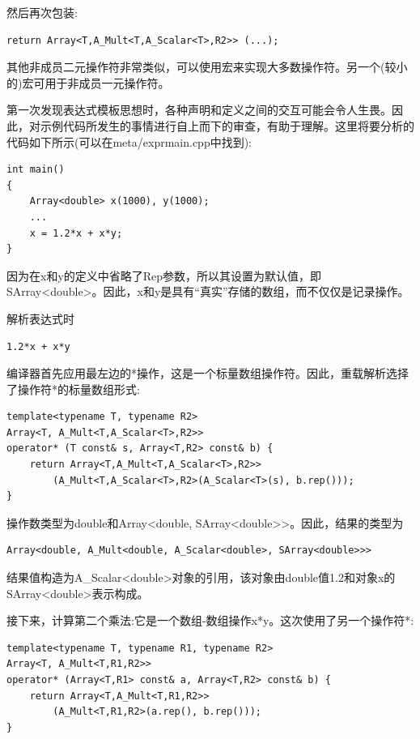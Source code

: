 然后再次包装:

\begin{lstlisting}[style=styleCXX]
return Array<T,A_Mult<T,A_Scalar<T>,R2>> (...);
\end{lstlisting}

其他非成员二元操作符非常类似，可以使用宏来实现大多数操作符。另一个(较小的)宏可用于非成员一元操作符。


第一次发现表达式模板思想时，各种声明和定义之间的交互可能会令人生畏。因此，对示例代码所发生的事情进行自上而下的审查，有助于理解。这里将要分析的代码如下所示(可以在meta/exprmain.cpp中找到):

\begin{lstlisting}[style=styleCXX]
int main()
{
	Array<double> x(1000), y(1000);
	...
	x = 1.2*x + x*y;
}
\end{lstlisting}

因为在x和y的定义中省略了Rep参数，所以其设置为默认值，即SArray<double>。因此，x和y是具有“真实”存储的数组，而不仅仅是记录操作。

解析表达式时

\begin{lstlisting}[style=styleCXX]
1.2*x + x*y
\end{lstlisting}

编译器首先应用最左边的*操作，这是一个标量数组操作符。因此，重载解析选择了操作符*的标量数组形式:

\begin{lstlisting}[style=styleCXX]
template<typename T, typename R2>
Array<T, A_Mult<T,A_Scalar<T>,R2>>
operator* (T const& s, Array<T,R2> const& b) {
	return Array<T,A_Mult<T,A_Scalar<T>,R2>>
		(A_Mult<T,A_Scalar<T>,R2>(A_Scalar<T>(s), b.rep()));
}
\end{lstlisting}

操作数类型为double和Array<double, SArray<double>{}>。因此，结果的类型为

\begin{lstlisting}[style=styleCXX]
Array<double, A_Mult<double, A_Scalar<double>, SArray<double>>>
\end{lstlisting}

结果值构造为A\_Scalar<double>对象的引用，该对象由double值1.2和对象x的SArray<double>表示构成。

接下来，计算第二个乘法:它是一个数组-数组操作x*y。这次使用了另一个操作符*:

\begin{lstlisting}[style=styleCXX]
template<typename T, typename R1, typename R2>
Array<T, A_Mult<T,R1,R2>>
operator* (Array<T,R1> const& a, Array<T,R2> const& b) {
	return Array<T,A_Mult<T,R1,R2>>
		(A_Mult<T,R1,R2>(a.rep(), b.rep()));
}
\end{lstlisting}

